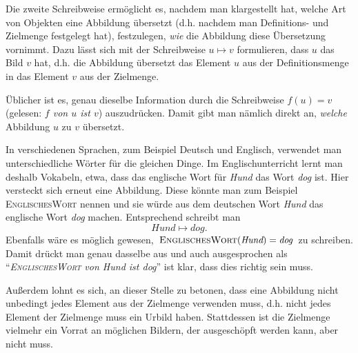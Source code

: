 \documentclass[../../main.tex]{subfiles}
\begin{document}
Die zweite Schreibweise ermöglicht es, nachdem man klargestellt hat, welche Art von Objekten eine Abbildung übersetzt (d.h. nachdem man Definitions- und Zielmenge festgelegt hat), festzulegen, \emph{wie} die Abbildung diese Übersetzung vornimmt. Dazu lässt sich mit der Schreibweise $u\mapsto v$ formulieren, dass $u$ das Bild $v$ hat, d.h. die Abbildung übersetzt das Element $u$ aus der Definitionsmenge in das Element $v$ aus der Zielmenge.

Üblicher ist es, genau dieselbe Information durch die Schreibweise $f(u)=v$ (gelesen: \emph{$f$ von $u$ ist $v$}) auszudrücken. Damit gibt man nämlich direkt an, \emph{welche} Abbildung $u$ zu $v$ übersetzt.

\begin{example}
    In verschiedenen Sprachen, zum Beispiel Deutsch und Englisch, verwendet man unterschiedliche Wörter für die gleichen Dinge. Im Englischunterricht lernt man deshalb Vokabeln, etwa, dass das englische Wort für \emph{Hund} das Wort \emph{dog} ist. Hier versteckt sich erneut eine Abbildung. Diese könnte man zum Beispiel \textsc{EnglischesWort} nennen und sie würde aus dem deutschen Wort \emph{Hund} das englische Wort \emph{dog} machen. Entsprechend schreibt man
    \[\textit{Hund}\mapsto\textit{dog}.\]
    Ebenfalls wäre es möglich gewesen, $\textsc{EnglischesWort}(\textit{Hund})=\textit{dog}$ zu schreiben. Damit drückt man genau dasselbe aus und auch ausgesprochen als \enquote{\emph{\textsc{EnglischesWort} von Hund ist dog}} ist klar, dass dies richtig sein muss.
\end{example}

Außerdem lohnt es sich, an dieser Stelle zu betonen, dass eine Abbildung nicht unbedingt jedes Element aus der Zielmenge verwenden muss, d.h. nicht jedes Element der Zielmenge muss ein Urbild haben. Stattdessen ist die Zielmenge vielmehr ein Vorrat an möglichen Bildern, der ausgeschöpft werden kann, aber nicht muss.
\end{document}
